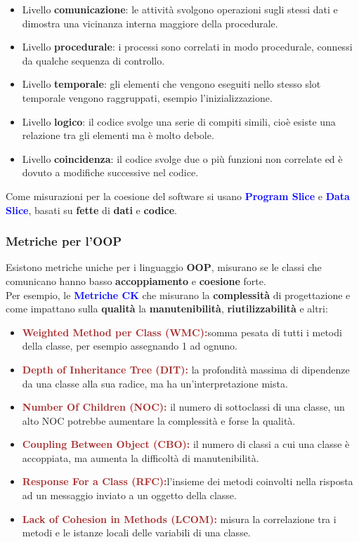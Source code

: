 \begin{itemize}
\begin{itemize}
        \item Livello \textbf{comunicazione}: le attività svolgono operazioni sugli stessi dati e dimostra una vicinanza interna maggiore della procedurale.
        \item Livello \textbf{procedurale}: i processi sono correlati in modo procedurale, connessi da qualche sequenza di controllo.
        \item Livello \textbf{temporale}: gli elementi che vengono eseguiti nello stesso slot temporale vengono raggruppati, esempio l'inizializzazione.
        \item Livello \textbf{logico}: il codice svolge una serie di compiti simili, cioè esiste una relazione tra gli elementi ma è molto debole.
        \item Livello \textbf{coincidenza}: il codice svolge due o più funzioni non correlate ed è dovuto a modifiche successive nel codice.
    \end{itemize}
    Come misurazioni per la coesione del software si usano \textbf{\textcolor{blue}{Program Slice}} e \textbf{\textcolor{blue}{Data Slice}}, basati su \textbf{fette} di \textbf{dati} e \textbf{codice}.
\end{itemize}

\subsubsection{Metriche per l'OOP}
Esistono metriche uniche per i linguaggio \textbf{OOP}, misurano se le classi che comunicano hanno basso \textbf{accoppiamento} e \textbf{coesione} forte. \\
Per esempio, le \textbf{\textcolor{blue}{Metriche CK}} che misurano la \textbf{complessità} di progettazione e come impattano sulla \textbf{qualità} la \textbf{manutenibilità}, \textbf{riutilizzabilità} e altri:
\begin{itemize}
    \item \textbf{\textcolor{brown}{Weighted Method per Class (WMC):}}somma pesata di tutti i metodi della classe, per esempio assegnando 1 ad ognuno.
    \item \textbf{\textcolor{brown}{Depth of Inheritance Tree (DIT):}} la profondità massima di dipendenze da una classe alla sua radice, ma ha un'interpretazione mista.
    \item \textbf{\textcolor{brown}{Number Of Children (NOC):}} il numero di sottoclassi di una classe, un alto NOC potrebbe aumentare la complessità e forse la qualità.
    \item \textbf{\textcolor{brown}{Coupling Between Object (CBO):}} il numero di classi a cui una classe è accoppiata, ma aumenta la difficoltà di manutenibilità.
    \item \textbf{\textcolor{brown}{Response For a Class (RFC):}}l'insieme dei metodi coinvolti nella risposta ad un messaggio inviato a un oggetto della classe.
    \item \textbf{\textcolor{brown}{Lack of Cohesion in Methods (LCOM):}} misura la correlazione tra i metodi e le istanze locali delle variabili di una classe.
\end{itemize}

